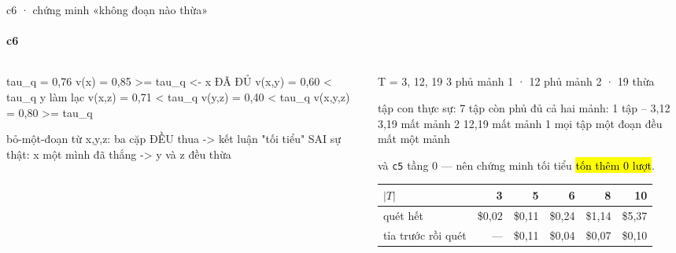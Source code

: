 
\begin{frame}[fragile]{c6 · chứng minh «không đoạn nào thừa»}
  \framesubtitle{c6}

  \begin{columns}[t]
  \begin{column}{0.47\textwidth}
    \begin{badb}[title={một ca khác — ba đoạn $x$, $y$, $z$}]
      \begin{dia}
tau_q = 0,76
v({x})     = 0,85  >= tau_q   <- x ĐÃ ĐỦ
v({x,y})   = 0,60  <  tau_q      y làm lạc
v({x,z})   = 0,71  <  tau_q
v({y,z})   = 0,40  <  tau_q
v({x,y,z}) = 0,80  >= tau_q

bỏ-một-đoạn từ {x,y,z}:
   ba cặp ĐỀU thua
   -> kết luận "tối tiểu"      SAI
sự thật:  {x} một mình đã thắng
   -> y và z đều thừa
      \end{dia}
    \end{badb}
  \end{column}
  \begin{column}{0.49\textwidth}
    \begin{keyb}[title={chỉ tập con CÒN PHỦ ĐỦ mới cần xét}]
      \begin{dia}
T = {3, 12, 19}
  3 phủ mảnh 1 · 12 phủ mảnh 2 · 19 thừa

tập con thực sự:         7 tập
còn phủ đủ cả hai mảnh:  1 tập -- {3,12}
  {3,19}  mất mảnh 2
  {12,19} mất mảnh 1
  mọi tập một đoạn đều mất một mảnh
      \end{dia}
      \vspace{0.25em}
      và \texttt{c5} tầng 0  — nên chứng minh tối tiểu
      \hl{tốn thêm 0 lượt}.
    \end{keyb}
    \begin{bx}
      \footnotesize
      \setlength{\tabcolsep}{2pt}
      \begin{tabular}[t]{@{}lrrrrr@{}}
        \toprule
        $|T|$ & 3 & 5 & 6 & 8 & 10\\
        \midrule
        quét hết & \$0,02 & \$0,11 & \$0,24 & \$1,14 & \$5,37\\
        tỉa trước rồi quét & — & \$0,11 & \$0,04 & \$0,07 & \$0,10\\
        \bottomrule
      \end{tabular}
    \end{bx}
  \end{column}
  \end{columns}
\end{frame}

